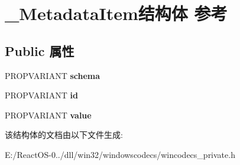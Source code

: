 \hypertarget{struct___metadata_item}{}\section{\+\_\+\+Metadata\+Item结构体 参考}
\label{struct___metadata_item}
\subsection*{Public 属性}
\begin{DoxyCompactItemize}
\item 
\mbox{\label{struct___metadata_item_ab0e4382f42faa6928bdf33d085a30240}} 
P\+R\+O\+P\+V\+A\+R\+I\+A\+NT {\bfseries schema}
\item 
\mbox{\label{struct___metadata_item_a7019f0166d22efff2028ff6e7add1e86}} 
P\+R\+O\+P\+V\+A\+R\+I\+A\+NT {\bfseries id}
\item 
\mbox{\label{struct___metadata_item_acac00f54710dfdfeda1f374960af5b69}} 
P\+R\+O\+P\+V\+A\+R\+I\+A\+NT {\bfseries value}
\end{DoxyCompactItemize}


该结构体的文档由以下文件生成\+:\begin{DoxyCompactItemize}
\item 
E\+:/\+React\+O\+S-\/0../dll/win32/windowscodecs/wincodecs\+\_\+private.\+h\end{DoxyCompactItemize}
